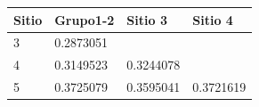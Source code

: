 \documentclass[]{book}
\begin{document}
\begin{longtable}[]{@{}llll@{}}
\toprule
\begin{minipage}[b]{0.09\columnwidth}\raggedright\strut
Sitio\strut
\end{minipage} & \begin{minipage}[b]{0.15\columnwidth}\raggedright\strut
Grupo1-2\strut
\end{minipage} & \begin{minipage}[b]{0.14\columnwidth}\raggedright\strut
Sitio 3\strut
\end{minipage} & \begin{minipage}[b]{0.15\columnwidth}\raggedright\strut
Sitio 4\strut
\end{minipage}\tabularnewline
\midrule
\endhead
\begin{minipage}[t]{0.09\columnwidth}\raggedright\strut
3\strut
\end{minipage} & \begin{minipage}[t]{0.15\columnwidth}\raggedright\strut
0.2873051\strut
\end{minipage} & \begin{minipage}[t]{0.14\columnwidth}\raggedright\strut
\strut
\end{minipage} & \begin{minipage}[t]{0.15\columnwidth}\raggedright\strut
\strut
\end{minipage}\tabularnewline
\begin{minipage}[t]{0.09\columnwidth}\raggedright\strut
4\strut
\end{minipage} & \begin{minipage}[t]{0.15\columnwidth}\raggedright\strut
0.3149523\strut
\end{minipage} & \begin{minipage}[t]{0.14\columnwidth}\raggedright\strut
0.3244078\strut
\end{minipage} & \begin{minipage}[t]{0.15\columnwidth}\raggedright\strut
\strut
\end{minipage}\tabularnewline
\begin{minipage}[t]{0.09\columnwidth}\raggedright\strut
5\strut
\end{minipage} & \begin{minipage}[t]{0.15\columnwidth}\raggedright\strut
0.3725079\strut
\end{minipage} & \begin{minipage}[t]{0.14\columnwidth}\raggedright\strut
0.3595041\strut
\end{minipage} & \begin{minipage}[t]{0.15\columnwidth}\raggedright\strut
0.3721619\strut
\end{minipage}\tabularnewline
\bottomrule
\end{longtable}
\end{document}
